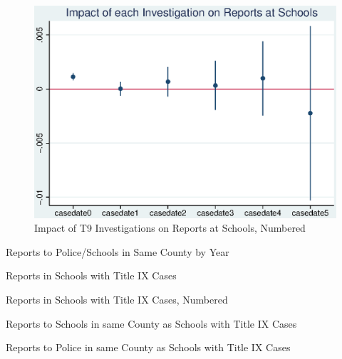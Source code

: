 \documentclass[AER]{AEA}
\begin{document}
\begin{figure}
\includegraphics[width=4.9in]{figures/cases_school_reports_numbered.eps}

\caption{Impact of T9 Investigations on Reports at Schools, Numbered}

\end{figure}

\begin{table}
\caption{Reports to Police/Schools in Same County by Year}



\end{table}


\begin{table}
\caption{Reports in Schools with Title IX Cases}



\end{table}

\begin{table}
\caption{Reports in Schools with Title IX Cases, Numbered}



\end{table}


\begin{table}
\caption{Reports to Schools in same County as Schools with Title IX Cases}


\end{table}

\begin{table}
\caption{Reports to Police in same County as Schools with Title IX Cases}



\end{table}
\end{document}
